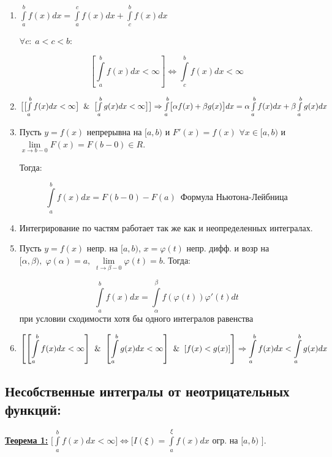 \documentclass[a4paper,12pt]{article} %
\begin{document}
\begin{enumerate}
    \item $\int\limits_a^{b} f(x) dx = \int\limits_a^{c} f(x) dx + \int\limits_c^{b} f(x) dx$

$\forall c:\; a<c<b:$

$$\left[\int\limits_a^{b} f(x) dx<\infty \right] \Leftrightarrow \int\limits_c^{b} f(x) dx < \infty$$

    \item $\bigl[ \bigl[ \int\limits_a^{b} f(x) dx<\infty\bigr] \And \bigl[ \int\limits_a^{b} g(x) dx<\infty \bigr]\bigr] \Rightarrow \int\limits_a^{b} \bigl[\alpha f(x) + \beta g(x)\bigr] dx = \alpha \int\limits_a^{b} f(x) dx + \beta \int\limits_a^{b} g(x) dx$
    
    \item Пусть $y=f(x)$ непрерывна на $[a, b)$ и $F'(x) = f(x)$ $\forall x\in[a, b)$ и $\lim\limits_{x\rightarrow b-0} F(x) = F(b-0) \in R$.
    
    Тогда:
    
    $$\int\limits_a^{b} f(x) dx = F(b-0) - F(a)\; ~ \text{Формула Ньютона-Лейбница}$$ 
    
    
    \item  Интегрирование по частям работает так же как и неопределенных интегралах.
    
    \item Пусть $y=f(x)$ непр. на $[a, b)$, $x=\varphi(t)$ непр. дифф. и возр на $[\alpha, \beta),\; \varphi(\alpha)=a,\; 
    \lim\limits_{t\rightarrow \beta - 0}\varphi(t) = b$. Тогда:
    
    $$\int\limits_a^{b} f(x) dx = \int\limits_\alpha^{\beta} f(\varphi(t))\varphi ' (t) dt$$
    при условии сходимости хотя бы одного интегралов равенства
    
    \item $$\left[ \left[ \int\limits_a^{b} f(x) dx<\infty \right] \And \left[ \int\limits_a^{b} g(x) dx<\infty \right] \And \left[ f(x) < g(x) \right] \right] \Rightarrow \int\limits_a^{b} f(x) dx < \int\limits_a^{b} g(x) dx $$
    
\end{enumerate}

\subsection{Несобственные интегралы от неотрицательных функций:}

\underline{\textbf{Теорема 1:}} $\bigl[ \int\limits_a^{b} f(x) dx <\infty \bigr] \Leftrightarrow \bigl[ I(\xi) = \int\limits_a^{\xi} f(x) dx$ \;огр.\; на\; $[a, b)$ $\bigr]$.\\
\end{document}
